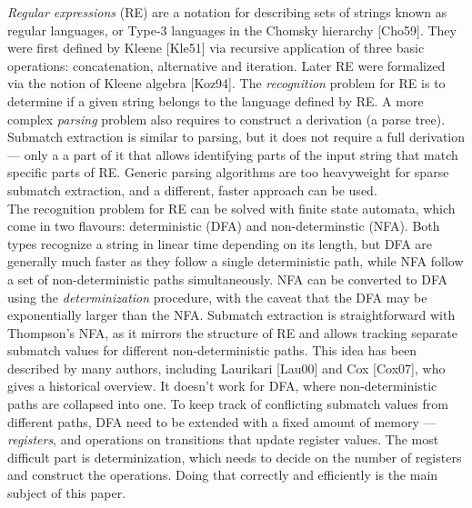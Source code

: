 \documentclass[]{article}
\begin{document}
\emph{Regular expressions} (RE) are a notation for describing sets of strings known as regular languages, or Type-3 languages in the Chomsky hierarchy [Cho59].
They were first defined by Kleene [Kle51] via recursive application of three basic operations: concatenation, alternative and iteration.
Later RE were formalized via the notion of Kleene algebra [Koz94].
The \emph{recognition} problem for RE is to determine if a given string belongs to the language defined by RE.
A more complex \emph{parsing} problem also requires to construct a derivation (a parse tree).
Submatch extraction is similar to parsing, but it does not require a full derivation ---
only a a part of it that allows identifying parts of the input string that match specific parts of RE.
Generic parsing algorithms are too heavyweight for sparse submatch extraction,
and a different, faster approach can be used.
\\

The recognition problem for RE can be solved with finite state automata,
which come in two flavours: deterministic (DFA) and non-determinstic (NFA).
Both types recognize a string in linear time depending on its length, but
DFA are generally much faster as they follow a single deterministic path,
while NFA follow a set of non-deterministic paths simultaneously.
NFA can be converted to DFA using the \emph{determinization} procedure,
with the caveat that the DFA may be exponentially larger than the NFA.
%
Submatch extraction is straightforward with Thompson's NFA, as it
mirrors the structure of RE and allows tracking separate submatch values for different non-deterministic paths.
This idea has been described by many authors, including Laurikari [Lau00] and Cox [Cox07], who gives a historical overview.
It doesn't work for DFA, where non-deterministic paths are collapsed into one.
To keep track of conflicting submatch values from different paths, DFA need to be extended with a fixed amount of memory --- \emph{registers},
and operations on transitions that update register values.
The most difficult part is determinization, which needs to decide on the number of registers and construct the operations.
Doing that correctly and efficiently is the main subject of this paper.
\\
\end{document}
